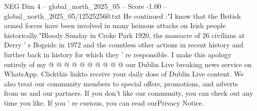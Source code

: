 \begin{textsample}{NEG Dim 4 – global\_north\_2025\_05 – Score -1.00 – global\_north\_2025\_05/125252560.txt}
He continued :"I know that the British armed forces have been involved in many heinous attacks on Irish people historically."Bloody Sunday in Croke Park 1920, the massacre of 26 civilians at Derry ' s Bogside in 1972 and the countless other actions in recent history and further back in history for which they ' re responsible.
I make this apology entirely of my @ @ @ @ @ @ @ @ @ @ our Dublin Live breaking news service on WhatsApp.
Clickthis linkto receive your daily dose of Dublin Live content.
We also treat our community members to special offers, promotions, and adverts from us and our partners.
If you don't like our community, you can check out any time you like.
If you ' re curious, you can read ourPrivacy Notice.

\end{textsample}

